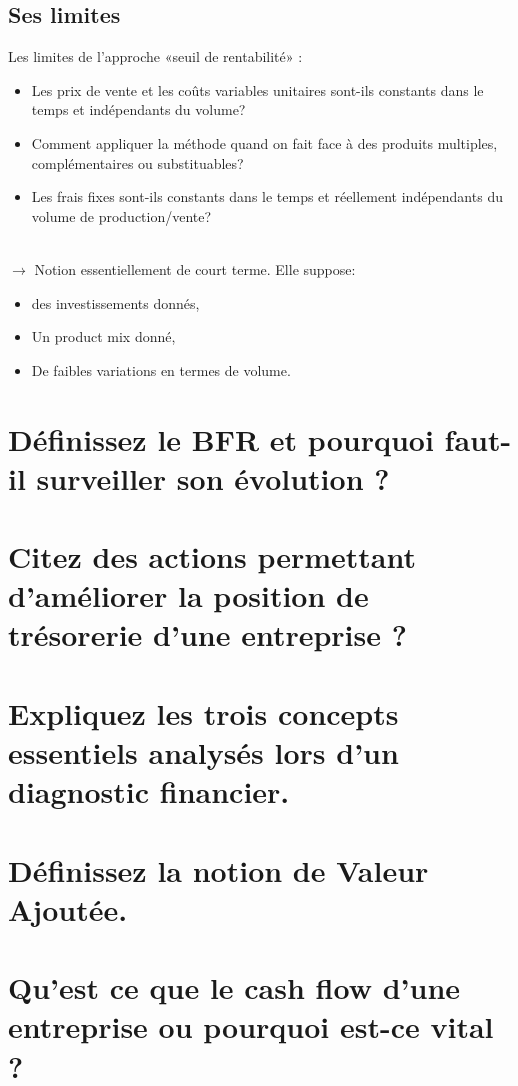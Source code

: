 \documentclass{article}
\begin{document}
\subsection{Ses limites}
Les limites de l’approche «seuil de rentabilité» :
\begin{itemize}
	\item Les prix de vente et les coûts variables unitaires sont-ils constants dans 
	le temps et indépendants du volume?
	\item Comment appliquer la méthode quand on fait face à des produits 
	multiples, complémentaires ou substituables?
	\item Les frais fixes sont-ils constants dans le temps et réellement
	indépendants du volume de production/vente?
\end{itemize}
~\\
$\rightarrow$ Notion essentiellement de court terme. Elle suppose:

\begin{itemize}
	\item des investissements donnés,
	\item Un product mix donné,
	\item De faibles variations en termes de volume.
\end{itemize}

\section{Définissez le BFR et pourquoi faut-il surveiller son évolution ?}
\section{Citez des actions permettant d’améliorer la position de trésorerie d’une entreprise ?}


\section{Expliquez les trois concepts essentiels analysés lors d’un diagnostic financier.}
\section{Définissez la notion de Valeur Ajoutée.}
\section{Qu’est ce que le cash flow d’une entreprise ou pourquoi est-ce vital ?}

\printbibliography
\end{document}
